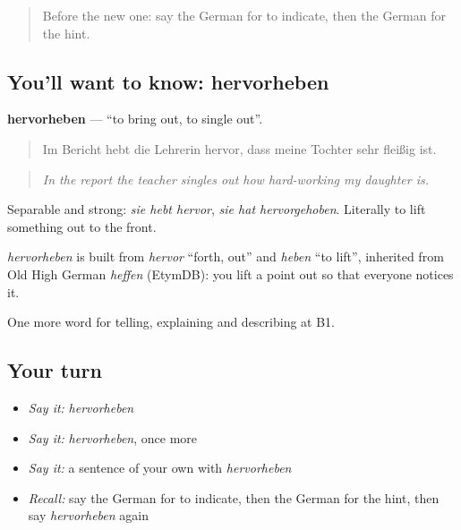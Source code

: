 \begin{quote}
Before the new one: say the German for to indicate, then the German for the hint.
\end{quote}

\subsection*{You'll want to know: hervorheben}
\textbf{hervorheben} — \textquotedblleft{}to bring out, to single out\textquotedblright{}.

\begin{quote}
Im Bericht hebt die Lehrerin hervor, dass meine Tochter sehr fleißig ist.
\end{quote}

\begin{quote}
\emph{In the report the teacher singles out how hard-working my daughter is.}
\end{quote}

Separable and strong: \emph{sie hebt hervor}, \emph{sie hat hervorgehoben}. Literally to lift something out to the front.

\begin{cousinweb}
\emph{hervorheben} is built from \emph{hervor} \textquotedblleft{}forth, out\textquotedblright{} and \emph{heben} \textquotedblleft{}to lift\textquotedblright{}, inherited from Old High German \emph{heffen} (EtymDB): you lift a point out so that everyone notices it.
\end{cousinweb}

\begin{grammarlens}[title={What you've built}]
One more word for telling, explaining and describing at B1.
\end{grammarlens}

\subsection*{Your turn}
\begin{itemize}
\raggedright
  \item \emph{Say it:} \emph{hervorheben}
  \item \emph{Say it:} \emph{hervorheben}, once more
  \item \emph{Say it:} a sentence of your own with \emph{hervorheben}
  \item \emph{Recall:} say the German for to indicate, then the German for the hint, then say \emph{hervorheben} again
\end{itemize}

